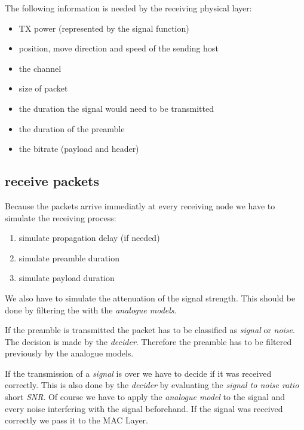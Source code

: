 The following information is needed by the receiving physical layer:

\begin{itemize}
\item TX power (represented by the signal function)
\item position, move direction and speed of the sending host
\item the channel
\item size of packet
\item the duration the signal would need to be transmitted
\item the duration of the preamble
\item the bitrate (payload and header)
\end{itemize}

\subsection{receive packets}

Because the packets arrive immediatly at every receiving node we have to simulate the receiving process:

\begin{enumerate}
\item simulate propagation delay (if needed)
\item simulate preamble duration
\item simulate payload duration
\end{enumerate}

We also have to simulate the attenuation of the signal strength. This should be done by filtering the with the \textit{analogue models}.

If the preamble is transmitted the packet has to be classified as \textit{signal} or \textit{noise}. The decision is made by the \textit{decider}. Therefore the preamble has to be filtered previously by the analogue models.

If the transmission of a \textit{signal} is over we have to decide if it was received correctly. This is also done by the \textit{decider} by evaluating the \textit{signal to noise ratio} short \textit{SNR}. Of course we have to apply the \textit{analogue model} to the signal and every noise interfering with the signal beforehand. If the signal was received correctly we pass it to the MAC Layer.

